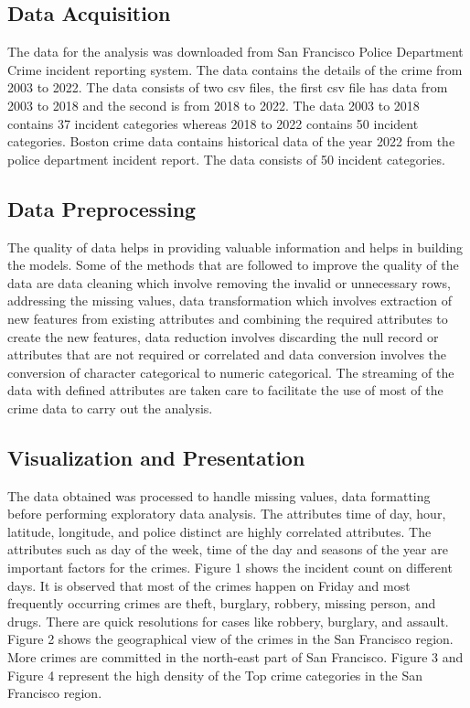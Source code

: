 \documentclass[conference,final,]{IEEEtran}
\begin{document}
\subsection{Data Acquisition}\label{data-acquisition}

The data for the analysis was downloaded from San Francisco Police
Department Crime incident reporting system. The data contains the
details of the crime from 2003 to 2022. The data consists of two csv files, the
first csv file has data from 2003 to 2018 and the second is from 2018 to
2022. The data 2003 to 2018 contains 37 incident categories whereas
2018 to 2022 contains 50 incident categories. Boston crime data contains
historical data of the year 2022 from the police department incident
report. The data consists of 50 incident categories.

\subsection{Data Preprocessing}\label{data-preprocessing}

The quality of data helps in providing valuable information and helps in
building the models. Some of the methods that are followed to improve
the quality of the data are data cleaning which involve removing the
invalid or unnecessary rows, addressing the missing values, data
transformation which involves extraction of new features from existing
attributes and combining the required attributes to create the new
features, data reduction involves discarding the null record or
attributes that are not required or correlated and data conversion
involves the conversion of character categorical to numeric categorical.
The streaming of the data with defined attributes are taken care to
facilitate the use of most of the crime data to carry out the analysis.

\subsection{Visualization and
Presentation}\label{visualization-and-presentation}

The data obtained was processed to handle missing values, data
formatting before performing exploratory data analysis. The attributes
time of day, hour, latitude, longitude, and police distinct are highly
correlated attributes. The attributes such as day of the week, time of
the day and seasons of the year are important factors for the crimes.
Figure 1 shows the incident count on different days. It is observed that
most of the crimes happen on Friday and most frequently occurring crimes
are theft, burglary, robbery, missing person, and drugs. There are quick
resolutions for cases like robbery, burglary, and assault. Figure 2
shows the geographical view of the crimes in the San Francisco region.
More crimes are committed in the north-east part of San Francisco.
Figure 3 and Figure 4 represent the high density of the Top crime
categories in the San Francisco region.
\end{document}
